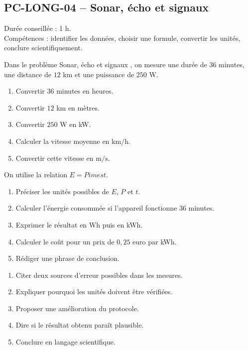 \documentclass[11pt,a4paper]{article}
\newcounter{exercice}
\begin{document}
\subsection{PC-LONG-04 -- Sonar, écho et signaux}

\begin{objectif}
Durée conseillée : 1 h.\\
Compétences : identifier les données, choisir une formule, convertir les unités, conclure scientifiquement.
\end{objectif}
\begin{exercice}
Dans le problème \og Sonar, écho et signaux \fg, on mesure une durée de $36$ minutes, une distance de $12$ km et une puissance de $250$ W.
\begin{enumerate}
  \item Convertir $36$ minutes en heures.
  \item Convertir $12$ km en mètres.
  \item Convertir $250$ W en kW.
  \item Calculer la vitesse moyenne en $\mathrm{km/h}$.
  \item Convertir cette vitesse en $\mathrm{m/s}$.
\end{enumerate}
\end{exercice}

\begin{exercice}
On utilise la relation $E=P	imes t$.
\begin{enumerate}
  \item Préciser les unités possibles de $E$, $P$ et $t$.
  \item Calculer l'énergie consommée si l'appareil fonctionne $36$ minutes.
  \item Exprimer le résultat en Wh puis en kWh.
  \item Calculer le coût pour un prix de $0{,}25$ euro par kWh.
  \item Rédiger une phrase de conclusion.
\end{enumerate}
\end{exercice}

\begin{exercice}
\begin{enumerate}
  \item Citer deux sources d'erreur possibles dans les mesures.
  \item Expliquer pourquoi les unités doivent être vérifiées.
  \item Proposer une amélioration du protocole.
  \item Dire si le résultat obtenu paraît plausible.
  \item Conclure en langage scientifique.
\end{enumerate}
\end{exercice}
\newpage
\end{document}
